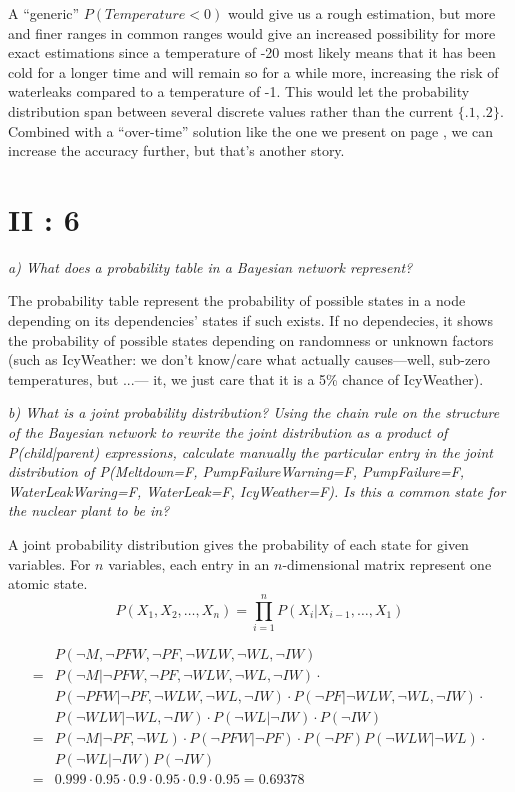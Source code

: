 A ``generic'' $P(Temperature < 0)$ would give us a rough estimation, but more and finer ranges in common ranges would give an increased possibility for more exact estimations since a temperature of -20 most likely means that it has been cold for a longer time and will remain so for a while more, increasing the risk of waterleaks compared to a temperature of -1. This would let the probability distribution span between several discrete values rather than the current $\{.1,.2\}$. Combined with a ``over-time'' solution like the one we present on page \pageref{42}, we can increase the accuracy further, but that's another story.

\section {II : 6}
\begin{framed}\em a) What does a probability table in a Bayesian network represent?\em\end{framed}
 The probability table represent the probability of possible states in a node depending on its dependencies' states if such exists. If no dependecies, it shows the probability of possible states depending on randomness or unknown factors (such as IcyWeather: we don't know/care what actually causes---well, sub-zero temperatures, but ...--- it, we just care that it is a 5\% chance of IcyWeather).

\begin{framed}\em b) What is a joint probability distribution? Using the chain rule on the structure of the Bayesian network to rewrite the joint distribution as a product of P(child|parent) expressions, calculate manually the particular entry in the joint distribution of P(Meltdown=F, PumpFailureWarning=F, PumpFailure=F, WaterLeakWaring=F, WaterLeak=F, IcyWeather=F). Is this a common state for the nuclear plant to be in?\em\end{framed}

A joint probability distribution gives the probability of each state for given variables. For $n$ variables, each entry in an $n$-dimensional matrix represent one atomic state.
$$  P(X_1,X_2,\dots,X_n) = \prod_{i=1}^{n} P(X_i|X_{i-1},\dots,X_1) $$

\begin{align*}
  & P(\neg M, \neg PFW, \neg PF, \neg WLW, \neg WL, \neg IW) \\
  = & P(\neg M|\neg PFW, \neg PF, \neg WLW, \neg WL, \neg IW)\cdot\\
  & P(\neg PFW | \neg PF, \neg WLW, \neg WL, \neg IW)\cdot P(\neg PF | \neg WLW, \neg WL, \neg IW)\cdot\\
  & P(\neg WLW | \neg WL, \neg IW)\cdot P(\neg WL | \neg IW)\cdot P(\neg IW)\\
  = & P(\neg M | \neg PF, \neg WL)\cdot P(\neg PFW | \neg PF)\cdot P(\neg PF)P(\neg WLW | \neg WL)\cdot
  \\ & P(\neg WL | \neg IW)P(\neg IW)\\
  = & 0.999\cdot0.95\cdot0.9\cdot0.95\cdot0.9\cdot0.95 = 0.69378
\end{align*}

